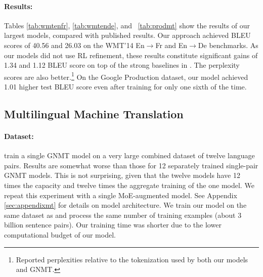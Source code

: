 \documentclass{article}
\begin{document}
\begin{table}[h!]
\caption{Results on the Google Production En$\rightarrow$ Fr dataset (bold values represent best results).}
\label{tab:prodmt}
\begin{center}
\vspace{-5pt}
\end{center}
\end{table}

\paragraph{Results:} Tables \ref{tab:wmtenfr}, \ref{tab:wmtende}, and ~\ref{tab:prodmt} show the results of our largest models, compared with published results.  Our approach achieved BLEU scores of 40.56 and 26.03 on the  WMT'14 En$\rightarrow$Fr and En$\rightarrow$De benchmarks. As our models did not use RL refinement, these results constitute significant gains of 1.34 and 1.12 BLEU score on top of the strong baselines in \citep{GNMT}. The perplexity scores are also better.\footnote{Reported perplexities relative to the tokenization used by both our models and GNMT.} On the Google Production dataset, our model achieved 1.01 higher test BLEU score even after training for only one sixth of the time.

\subsection{Multilingual Machine Translation}
\label{sec:mlmt}

\paragraph{Dataset:} \citep{Johnson16} train a single GNMT \citep{GNMT} model on a very large combined dataset of twelve language pairs.  Results are somewhat worse than those for 12 separately trained single-pair GNMT models.  This is not surprising, given that the twelve models have 12 times the capacity and twelve times the aggregate training of the one model.  We repeat this experiment with a single MoE-augmented model.  See Appendix \ref{sec:appendixmt} for details on model architecture.  We train our model on the same dataset as \citep{Johnson16} and process the same number of training examples (about 3 billion sentence pairs).  Our training time was shorter due to the lower computational budget of our model.
\end{document}

